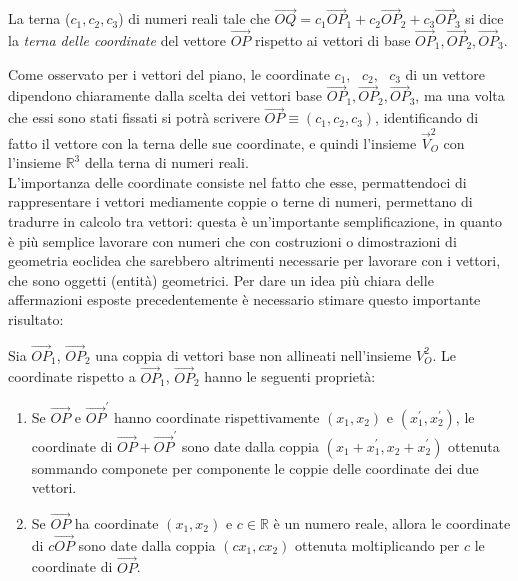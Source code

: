\begin{defi}
  \label{defi:ternadinumerireali}
  La terna ($c_1,c_2,c_3$) di numeri reali tale che $\vec{OQ}= c_1\vec{OP}_1+c_2\vec{OP}_2+c_3\vec{OP}_3$ si dice la \textit{terna delle coordinate} del vettore $\vec{OP}$ rispetto ai vettori di base $\vec{OP}_1,\vec{OP}_2, \vec{OP}_3$.
\end{defi}
Come osservato per i vettori del piano, le coordinate $c_1, \text{ } c_2, \text{ } c_3$ di un vettore dipendono chiaramente dalla scelta dei vettori base $\vec{OP}_1,\vec{OP}_2, \vec{OP}_3$, ma una volta che essi sono stati fissati si potrà scrivere $\vec{OP}\equiv (c_1,c_2,c_3)$, identificando di fatto il vettore con la terna delle sue coordinate, e quindi l'insieme $\vec{V}_O^2$ con l'insieme $\mathds{R}^3$ della terna di numeri reali.\\
L'importanza delle coordinate consiste nel fatto che esse, permattendoci di rappresentare i vettori mediamente coppie o terne di numeri, permettano di tradurre in calcolo tra vettori: questa è un'importante semplificazione, in quanto è più semplice lavorare con numeri che con costruzioni o dimostrazioni di geometria eoclidea che sarebbero altrimenti necessarie per lavorare con i vettori, che sono oggetti (entità) geometrici. Per dare un idea più chiara delle affermazioni esposte precedentemente è necessario stimare questo importante risultato:
\begin{prop}
  \label{prop:coordinate1}
  Sia $\vec{OP}_1$, $\vec{OP}_2$ una coppia di vettori base non allineati nell'insieme $V_O^2$. Le coordinate rispetto a $\vec{OP}_1$, $\vec{OP}_2$ hanno le seguenti proprietà:
  \begin{enumerate}
  \item Se $\vec{OP}$ e $\vec{OP}^\prime$ hanno coordinate rispettivamente $(x_1,x_2)$ e $(x^\prime_1,x^\prime_2)$, le coordinate di $\vec{OP}+\vec{OP}^\prime$ sono date dalla coppia $(x_1+x^\prime_1,x_2+x^\prime_2)$ ottenuta sommando componete per componente le coppie delle coordinate dei due vettori.
  \item Se $\vec{OP}$ ha coordinate $(x_1,x_2)$ e $c\in \mathds{R}$ è un numero reale, allora le coordinate di $c\vec{OP}$ sono date dalla coppia $(cx_1,cx_2)$ ottenuta moltiplicando per $c$ le coordinate di $\vec{OP}$.
  \end{enumerate}
\end{prop}
